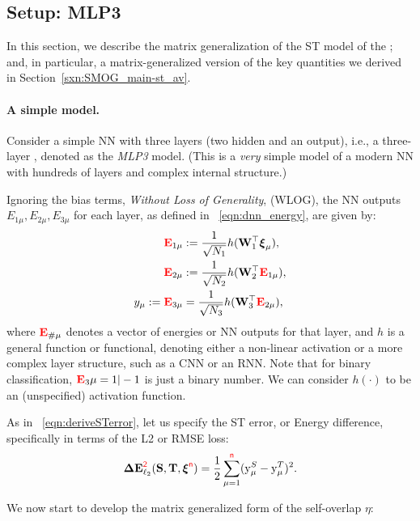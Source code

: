 \subsection{\MultiLayer Setup: MLP3}
\label{sxn:matgen_mlp3}

In this section, we describe the matrix generalization of the ST  model of the \LinearPerceptron; and, 
in particular, a matrix-generalized version of the key quantities we derived in Section~\ref{sxn:SMOG_main-st_av}.

\paragraph{A simple model.}

Consider a simple NN with three layers (two hidden and an output), i.e., a three-layer \MultiLayerPerceptron, denoted as the \emph{MLP3} model.
(This is a \emph{very} simple model of a modern NN with hundreds of layers and complex internal structure.)

Ignoring the bias terms, \emph{Without Loss of Generality}, (WLOG), the NN outputs
 $E_{1\mu},E_{2\mu},E_{3\mu}$ for each layer, as defined in \EQN~\ref{eqn:dnn_energy}, are given by:
\begin{align}
\nonumber
  {{\color{red}\sf{\mathbf{E}}}}_{1\mu} &:= \frac{1}{\sqrt{N_1}} h ({\mathbf{W}}_1^\top \boldsymbol{\xi}_{\mu}) , \\
\nonumber
  {{\color{red}\sf{\mathbf{E}}}}_{2\mu} &:= \frac{1}{\sqrt{N_2}} h ({\mathbf{W}}_2^\top {{\color{red}\sf{\mathbf{E}}}}_{1\mu})     , \\
\label{eqn:nflow}
             y_{\mu} := {{\color{red}\sf{\mathbf{E}}}}_{3\mu} &= \frac{1}{\sqrt{N_3}} h ({\mathbf{W}}_{3}^\top {{\color{red}\sf{\mathbf{E}}}}_{2\mu})     ,
\end{align}
where ${{\color{red}\sf{\mathbf{E}}}}_{\#\mu}$ denotes a vector of energies or NN outputs for that layer, and $h$ is a general function or functional, denoting either a non-linear activation or a more complex layer structure, such as a CNN or an RNN. Note that for binary classification, ${{\color{red}\sf{\mathbf{E}}}}_3{\mu}=1|-1$ is just a binary number.
We can consider $h(\cdot)$ to be an (unspecified) activation function.

As in \EQN~\ref{eqn:deriveSTerror}, let us specify the ST error, or Energy difference, specifically in terms of the L2 or RMSE loss:
\begin{equation}
\label{eqn:DE}
\mathbf{\Delta {E}}^{{\color{red}\sf{2}}}_{\ell_2}({\mathbf{S}},{\mathbf{T}}, \boldsymbol{\xi}^{{\color{red}\sf{n}}}) = \frac{1}{2}\sum_{\mu=1}^{{\color{red}\sf{n}}} (\mathrm{y}_{\mu}^{S} - \mathrm{y}_{\mu}^{T})^2.
\end{equation}

We now start to develop the matrix generalized form of the self-overlap \(\eta\):

